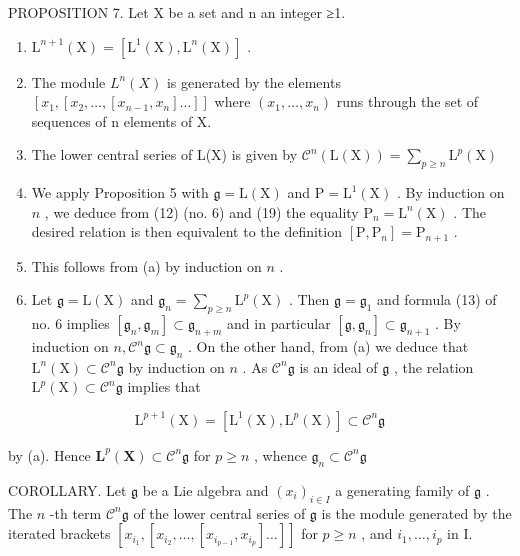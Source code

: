 PROPOSITION 7. Let X be a set and n an integer ≥1.

\begin{enumerate}
\def\labelenumi{(\alph{enumi})}
\item
  \(\mathrm{L}^{n+1}(\mathrm{X}) = [\mathrm{L}^{1}(\mathrm{X}), \mathrm{L}^{n}(\mathrm{X})]\) .
\item
  The module \(L^{n}(X)\) is generated by the elements \([x_{1}, [x_{2}, \ldots, [x_{n-1}, x_{n}] \ldots]]\) where \((x_{1}, \ldots, x_{n})\) runs through the set of sequences of n elements of X.
\item
  The lower central series of L(X) is given by \(\mathcal{C}^n (\mathrm{L}(\mathrm{X})) = \sum_{p\geqslant n}\mathrm{L}^p (\mathrm{X})\)
\item
  We apply Proposition 5 with \(\mathfrak{g} = \mathrm{L}(\mathrm{X})\) and \(\mathrm{P} = \mathrm{L}^{1}(\mathrm{X})\) . By induction on \(n\) , we deduce from (12) (no. 6) and (19) the equality \(\mathrm{P}_{n} = \mathrm{L}^{n}(\mathrm{X})\) . The desired relation is then equivalent to the definition \([\mathrm{P}, \mathrm{P}_{n}] = \mathrm{P}_{n + 1}\) .
\item
  This follows from (a) by induction on \(n\) .
\item
  Let \(\mathfrak{g} = \mathrm{L}(\mathrm{X})\) and \(\mathfrak{g}_{n} = \sum_{p\geqslant n}\mathrm{L}^{p}(\mathrm{X})\) . Then \(\mathfrak{g} = \mathfrak{g}_1\) and formula (13) of no. 6 implies \([\mathfrak{g}_{n},\mathfrak{g}_{m}]\subset \mathfrak{g}_{n + m}\) and in particular \([\mathfrak{g},\mathfrak{g}_n]\subset \mathfrak{g}_{n + 1}\) . By induction on \(n,\mathcal{C}^{n}\mathfrak{g}\subset \mathfrak{g}_{n}\) . On the other hand, from (a) we deduce that \(\mathrm{L}^{n}(\mathrm{X})\subset \mathcal{C}^{n}\mathfrak{g}\) by induction on \(n\) . As \(\mathcal{C}^{n}\mathfrak{g}\) is an ideal of \(\mathfrak{g}\) , the relation \(\mathrm{L}^p (\mathrm{X})\subset \mathcal{C}^{n}\mathfrak{g}\) implies that
\end{enumerate}

\[
\mathrm{L} ^ {p + 1} (\mathrm{X}) = [ \mathrm{L} ^ {1} (\mathrm{X}), \mathrm{L} ^ {p} (\mathrm{X}) ] \subset \mathcal {C} ^ {n} \mathfrak {g}
\]

by (a). Hence \(\mathbf{L}^p (\mathbf{X})\subset \mathcal{C}^{n}\mathfrak{g}\) for \(p\geqslant n\) , whence \(\mathfrak{g}_n\subset \mathcal{C}^{n}\mathfrak{g}\)

COROLLARY. Let \(\mathfrak{g}\) be a Lie algebra and \((x_{i})_{i\in I}\) a generating family of \(\mathfrak{g}\) . The \(n\) -th term \(\mathcal{C}^{n}\mathfrak{g}\) of the lower central series of \(\mathfrak{g}\) is the module generated by the iterated brackets \([x_{i_1}, [x_{i_2}, \ldots, [x_{i_{p-1}}, x_{i_p}] \ldots]]\) for \(p \geqslant n\) , and \(i_1, \ldots, i_p\) in I.

